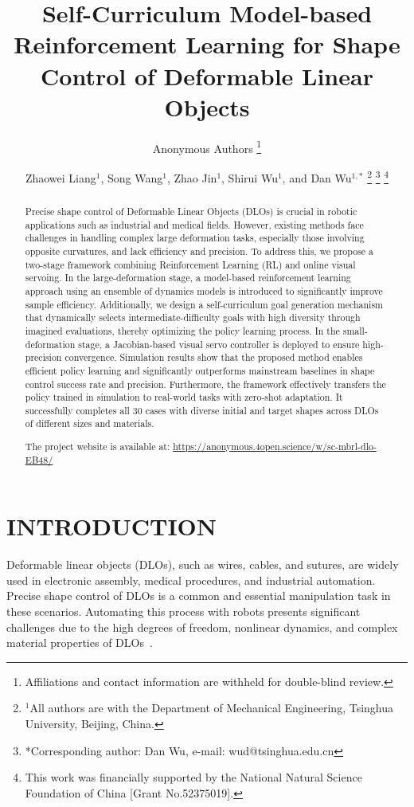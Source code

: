 \documentclass[letterpaper, 10 pt, conference]{ieeeconf}  %
\title{\LARGE \bf
Self-Curriculum Model-based Reinforcement Learning for Shape Control of Deformable Linear Objects
}
\author{Anonymous Authors%
\thanks{Affiliations and contact information are withheld for double-blind review.}%
}
\author{Zhaowei Liang$^{1}$, Song Wang$^{1}$, Zhao Jin$^{1}$, Shirui Wu$^{1}$, and Dan Wu$^{1,*}$%
\thanks{$^{1}$All authors are with the Department of Mechanical Engineering, Tsinghua University, Beijing, China.}%
\thanks{*Corresponding author: Dan Wu, e-mail: wud@tsinghua.edu.cn}%
\thanks{This work was financially supported by the National Natural Science Foundation of China [Grant No.52375019].}%
}
\newif\ifanonymous
\begin{document}


\maketitle
\thispagestyle{empty}
\pagestyle{empty}


\begin{abstract}

Precise shape control of Deformable Linear Objects (DLOs) is crucial in robotic applications such as industrial and medical fields. However, existing methods face challenges in handling complex large deformation tasks, especially those involving opposite curvatures, and lack efficiency and precision. To address this, we propose a two-stage framework combining Reinforcement Learning (RL) and online visual servoing. In the large-deformation stage, a model-based reinforcement learning approach using an ensemble of dynamics models is introduced to significantly improve sample efficiency. Additionally, we design a self-curriculum goal generation mechanism that dynamically selects intermediate-difficulty goals with high diversity through imagined evaluations, thereby optimizing the policy learning process. In the small-deformation stage, a Jacobian-based visual servo controller is deployed to ensure high-precision convergence. Simulation results show that the proposed method enables efficient policy learning and significantly outperforms mainstream baselines in shape control success rate and precision. Furthermore, the framework effectively transfers the policy trained in simulation to real-world tasks with zero-shot adaptation. It successfully completes all 30 cases with diverse initial and target shapes across DLOs of different sizes and materials.
\ifanonymous
The project website will be accessible upon acceptance.
\else
The project website is available at: \url{https://anonymous.4open.science/w/sc-mbrl-dlo-EB48/}
\fi
\end{abstract}


\section{INTRODUCTION}

Deformable linear objects (DLOs), such as wires, cables, and sutures, are widely used in electronic assembly, medical procedures, and industrial automation. Precise shape control of DLOs is a common and essential manipulation task in these scenarios. Automating this process with robots presents significant challenges due to the high degrees of freedom, nonlinear dynamics, and complex material properties of DLOs~\cite{gu2025learning,wang2025self,wu2024optimization}.
\end{document}
